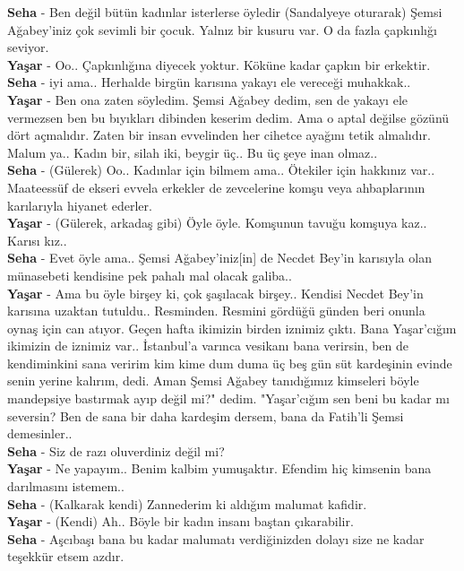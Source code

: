 \documentclass[]{book}
\begin{document}
\textbf{Seha} - Ben değil bütün kadınlar isterlerse öyledir (Sandalyeye oturarak) Şemsi Ağabey'iniz çok sevimli bir çocuk. Yalnız bir kusuru var. O da fazla çapkınlığı seviyor.\\
\textbf{Yaşar} - Oo.. Çapkınlığına diyecek yoktur. Köküne kadar çapkın bir erkektir.\\
\textbf{Seha} - iyi ama.. Herhalde birgün karısına yakayı ele vereceği muhakkak..\\
\textbf{Yaşar} - Ben ona zaten söyledim. Şemsi Ağabey dedim, sen de yakayı ele vermezsen ben bu bıyıkları dibinden keserim dedim. Ama o aptal değilse gözünü dört açmalıdır. Zaten bir insan evvelinden her cihetce ayağını tetik almalıdır. Malum ya.. Kadın bir, silah iki, beygir üç.. Bu üç şeye inan olmaz..\\
\textbf{Seha} - (Gülerek) Oo.. Kadınlar için bilmem ama.. Ötekiler için hakkınız var.. Maateessüf de ekseri evvela erkekler de zevcelerine komşu veya ahbaplarının karılarıyla hiyanet ederler.\\
\textbf{Yaşar} - (Gülerek, arkadaş gibi) Öyle öyle. Komşunun tavuğu komşuya kaz.. Karısı kız..\\
\textbf{Seha} - Evet öyle ama.. Şemsi Ağabey'iniz{[}in{]} de Necdet Bey'in karısıyla olan münasebeti kendisine pek pahalı mal olacak galiba..\\
\textbf{Yaşar} - Ama bu öyle birşey ki, çok şaşılacak birşey.. Kendisi Necdet Bey'in karısına uzaktan tutuldu.. Resminden. Resmini gördüğü günden beri onunla oynaş için can atıyor. Geçen hafta ikimizin birden iznimiz çıktı. Bana Yaşar'cığım ikimizin de iznimiz var.. İstanbul'a varınca vesikanı bana verirsin, ben de kendiminkini sana veririm kim kime dum duma üç beş gün süt kardeşinin evinde senin yerine kalırım, dedi. Aman Şemsi Ağabey tanıdığımız kimseleri böyle mandepsiye bastırmak ayıp değil mi?" dedim. "Yaşar'cığım sen beni bu kadar mı seversin? Ben de sana bir daha kardeşim dersem, bana da Fatih'li Şemsi demesinler..\\
\textbf{Seha} - Siz de razı oluverdiniz değil mi?\\
\textbf{Yaşar} - Ne yapayım.. Benim kalbim yumuşaktır. Efendim hiç kimsenin bana darılmasını istemem..\\
\textbf{Seha} - (Kalkarak kendi) Zannederim ki aldığım malumat kafidir.\\
\textbf{Yaşar} - (Kendi) Ah.. Böyle bir kadın insanı baştan çıkarabilir.\\
\textbf{Seha} - Aşcıbaşı bana bu kadar malumatı verdiğinizden dolayı size ne kadar teşekkür etsem azdır.\\
\end{document}
